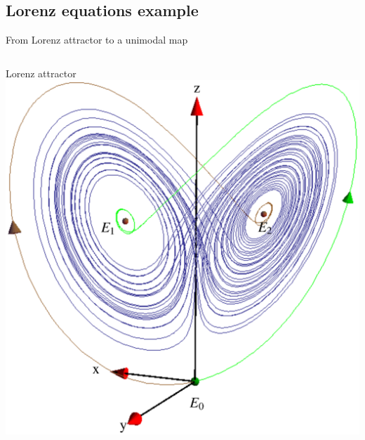 \documentclass{beamer}
\begin{document}
\subsection{Lorenz equations example}

\begin{frame}{From Lorenz attractor to a unimodal map}
	\begin{columns}[t]
		\begin{exampleblock}{Lorenz attractor}
			\includegraphics[width=\textwidth,clip=true]{../../figs/lorenzAttr}
		\end{exampleblock}
	\end{columns}
\end{frame}
\end{document}
